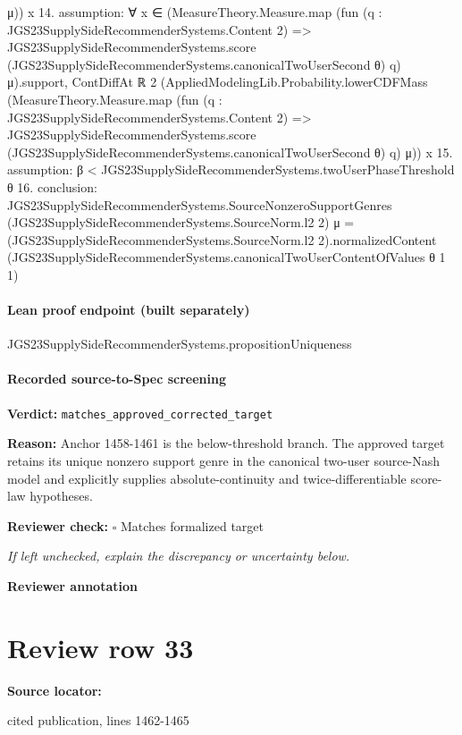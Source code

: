 \documentclass[10pt]{article}
\newcommand{\reviewerbox}{%
  \par\noindent\fbox{\parbox{0.96\linewidth}{\rule{0pt}{0.38in}}}\par
}
\newcommand{\reviewmatch}[1]{%
  \par\noindent\textbf{Reviewer check:} $\square$\; #1\par
  \noindent\emph{If left unchecked, explain the discrepancy or uncertainty below.}\par
}
\begin{document}
\begin{ReviewVerbatim}
        μ))
    x
14. assumption: ∀
  x ∈
    (MeasureTheory.Measure.map
        (fun (q : JGS23SupplySideRecommenderSystems.Content 2) =>
          JGS23SupplySideRecommenderSystems.score (JGS23SupplySideRecommenderSystems.canonicalTwoUserSecond θ) q)
        μ).support,
  ContDiffAt ℝ 2
    (AppliedModelingLib.Probability.lowerCDFMass
      (MeasureTheory.Measure.map
        (fun (q : JGS23SupplySideRecommenderSystems.Content 2) =>
          JGS23SupplySideRecommenderSystems.score (JGS23SupplySideRecommenderSystems.canonicalTwoUserSecond θ) q)
        μ))
    x
15. assumption: β < JGS23SupplySideRecommenderSystems.twoUserPhaseThreshold θ
16. conclusion: JGS23SupplySideRecommenderSystems.SourceNonzeroSupportGenres (JGS23SupplySideRecommenderSystems.SourceNorm.l2 2) μ =
  {(JGS23SupplySideRecommenderSystems.SourceNorm.l2 2).normalizedContent
      (JGS23SupplySideRecommenderSystems.canonicalTwoUserContentOfValues θ 1 1)}
\end{ReviewVerbatim}

\paragraph{Lean proof endpoint (built separately)}\begin{ReviewVerbatim}
JGS23SupplySideRecommenderSystems.propositionUniqueness
\end{ReviewVerbatim}

\paragraph{Recorded source-to-Spec screening}
\textbf{Verdict:} \texttt{matches\_approved\_corrected\_target}
\\
{\raggedright
\textbf{Reason:} Anchor 1458-\allowbreak{}1461 is the below-\allowbreak{}threshold branch.\allowbreak{}  The approved target retains its unique nonzero support genre in the canonical two-\allowbreak{}user source-\allowbreak{}Nash model and explicitly supplies absolute-\allowbreak{}continuity and twice-\allowbreak{}differentiable score-\allowbreak{}law hypotheses.\allowbreak{}
\par}
\reviewmatch{Matches formalized target}
\noindent\textbf{Reviewer annotation}\par
\reviewerbox
\clearpage
\hypertarget{source-claim-e8b3d8be64a516a4}{}
\section*{Review row 33}
\textbf{Source locator:} {\footnotesize\raggedright cited publication, lines 1462-\allowbreak{}1465\par}
\end{document}
